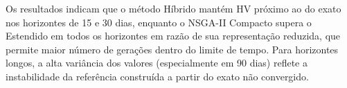 \begin{table}[h]
	\centering
	\caption{Hipervolume relativo ao método exato.}
	\label{tab:hipervolume}
	\fautor
\end{table}

Os resultados indicam que o método Híbrido mantém HV próximo ao do exato nos horizontes de 15 e 30 dias, enquanto o NSGA-II Compacto supera o Estendido em todos os horizontes em razão de sua representação reduzida, que permite maior número de gerações dentro do limite de tempo. Para horizontes longos, a alta variância dos valores (especialmente em 90 dias) reflete a instabilidade da referência construída a partir do exato não convergido.

